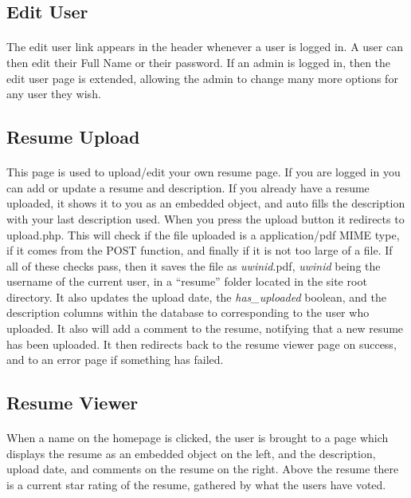 \documentclass[11pt,letterpaper,titlepage]{article}
\begin{document}
        \subsection{Edit User}
        \paragraph{}
        The edit user link appears in the header whenever a user is logged in. A
        user can then edit their Full Name or their password. If an admin is
        logged in, then the edit user page is extended, allowing the admin to
        change many more options for any user they wish.

        \subsection{Resume Upload}
        \paragraph{}
        This page is used to upload/edit your own resume page. If you are logged
        in you can add or update a resume and description. If you already have a
        resume uploaded, it shows it to you as an embedded object, and auto
        fills the description with your last description used. When you press
        the upload button it redirects to upload.php. This will check if the
        file uploaded is a application/pdf MIME type, if it comes from the POST
        function, and finally if it is not too large of a file. If all of these
        checks pass, then it saves the file as \emph{uwinid}.pdf, \emph{uwinid}
        being the username of the current user, in a ``resume'' folder located
        in the site root directory. It also updates the upload date, the
        \emph{has\_uploaded} boolean, and the description columns within the
        database to corresponding to the user who uploaded. It also will add a
        comment to the resume, notifying that a new resume has been uploaded. It
        then redirects back to the resume viewer page on success, and to an
        error page if something has failed.

        \subsection{Resume Viewer}
        \paragraph{}
        When a name on the homepage is clicked, the user is brought to a page
        which displays the resume as an embedded object on the left, and the
        description, upload date, and comments on the resume on the right. Above
        the resume there is a current star rating of the resume, gathered by
        what the users have voted.
\end{document}
